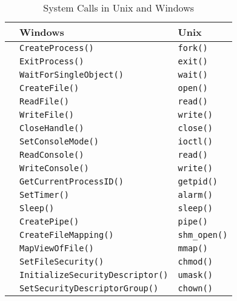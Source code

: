 \begin{table}[h!tbp]
  \centering
  \begin{tabular}{lll}
    \toprule
    & \textbf{Windows} & \textbf{Unix} \\
    \midrule
    \nameref{subsec:Process_Control} & \texttt{CreateProcess()} & \texttt{fork()} \\
    & \texttt{ExitProcess()} & \texttt{exit()} \\
    & \texttt{WaitForSingleObject()} & \texttt{wait()} \\
    \midrule
    \nameref{subsec:File_Manipulation} & \texttt{CreateFile()} & \texttt{open()} \\
    & \texttt{ReadFile()} & \texttt{read()} \\
    & \texttt{WriteFile()} & \texttt{write()} \\
    & \texttt{CloseHandle()} & \texttt{close()} \\
    \midrule
    \nameref{subsec:Device_Manipulation} & \texttt{SetConsoleMode()} & \texttt{ioctl()} \\
    & \texttt{ReadConsole()} & \texttt{read()} \\
    & \texttt{WriteConsole()} & \texttt{write()} \\
    \midrule
    \nameref{subsec:Information_Maintenance} & \texttt{GetCurrentProcessID()} & \texttt{getpid()} \\
    & \texttt{SetTimer()} & \texttt{alarm()} \\
    & \texttt{Sleep()} & \texttt{sleep()} \\
    \midrule
    \nameref{subsec:Communications} & \texttt{CreatePipe()} & \texttt{pipe()} \\
    & \texttt{CreateFileMapping()} & \texttt{shm_open()} \\
    & \texttt{MapViewOfFile()} & \texttt{mmap()} \\
    \midrule
    \nameref{subsec:Protection} & \texttt{SetFileSecurity()} & \texttt{chmod()} \\
    & \texttt{InitializeSecurityDescriptor()} & \texttt{umask()} \\
    & \texttt{SetSecurityDescriptorGroup()} & \texttt{chown()} \\
    \bottomrule
  \end{tabular}
  \caption{System Calls in Unix and Windows}
  \label{tab:System_Calls_Examples}
\end{table}

